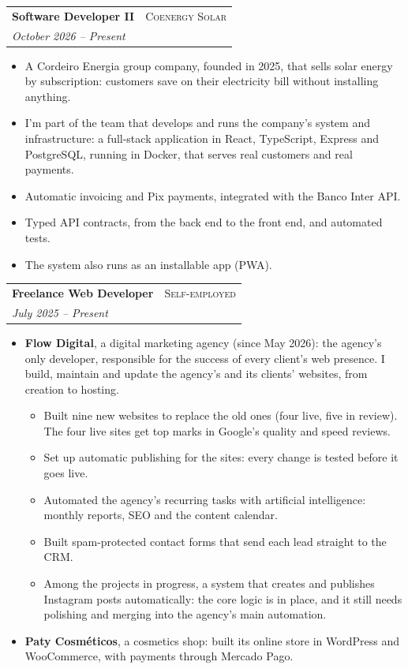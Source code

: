 \documentclass[a4paper,11pt]{article}
\makeatletter
\newcommand{\datedsubsection}[4]{%
  \vspace{0.8ex}
  \noindent\begin{tabular*}{\textwidth}{@{\extracolsep{\fill}} l r@{}}
    \textbf{#3} & \scshape{#2} \\
    \textit{#1} & \\
  \end{tabular*}\par
  \vspace{0.5ex}
  \justifying\noindent
  #4\par
}
\makeatother
\begin{document}
\datedsubsection{October 2026 -- Present}{Coenergy Solar}%
{Software Developer II}{
  \begin{itemize}
    \item A Cordeiro Energia group company, founded in 2025, that sells solar
    energy by subscription: customers save on their electricity bill without
    installing anything.
    \item I'm part of the team that develops and runs the company's system and
    infrastructure: a full-stack application in React, TypeScript, Express
    and PostgreSQL, running in Docker, that serves real customers and real
    payments.
    \item Automatic invoicing and Pix payments, integrated with the Banco Inter
    API.
    \item Typed API contracts, from the back end to the front end, and
    automated tests.
    \item The system also runs as an installable app (PWA).
  \end{itemize}
}

\datedsubsection{July 2025 -- Present}{Self-employed}%
{Freelance Web Developer}{
  \begin{itemize}
    \item \textbf{Flow Digital}, a digital marketing agency (since May 2026):
    the agency's only developer, responsible for the success of every client's
    web presence.  I build, maintain and update the agency's and its clients'
    websites, from creation to hosting.
    \begin{itemize}
      \item Built nine new websites to replace the old ones (four live, five
      in review).  The four live sites get top marks in Google's quality and
      speed reviews.
      \item Set up automatic publishing for the sites: every change is tested
      before it goes live.
      \item Automated the agency's recurring tasks with artificial
      intelligence: monthly reports, SEO and the content calendar.
      \item Built spam-protected contact forms that send each lead straight
      to the CRM.
      \item Among the projects in progress, a system that creates and
      publishes Instagram posts automatically: the core logic is in place,
      and it still needs polishing and merging into the agency's main
      automation.
    \end{itemize}
    \item \textbf{Paty Cosméticos}, a cosmetics shop: built its online store in
    WordPress and WooCommerce, with payments through Mercado Pago.
  \end{itemize}
}
\end{document}
